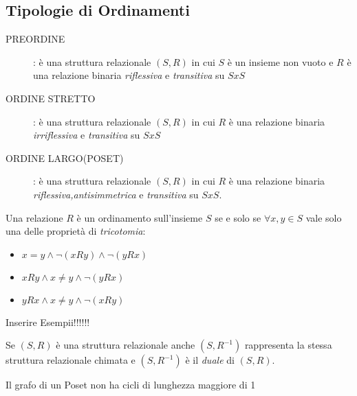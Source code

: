 \subsection{Tipologie di Ordinamenti}
\begin{description}
    \item[PREORDINE]: è una struttura relazionale $(S,R)$ in cui $S$ è un insieme non vuoto
          e $R$ è una relazione binaria \emph{riflessiva} e \emph{transitiva} su $S x S$
    \item[ORDINE STRETTO]: è una struttura relazionale $(S,R)$ in cui $R$ è una
          relazione binaria \emph{irriflessiva} e \emph{transitiva} su $S x S$
    \item[ORDINE LARGO(POSET)]: è una struttura relazionale $(S,R)$ in cui $R$ è una
          relazione binaria \emph{riflessiva,antisimmetrica} e \emph{transitiva} su $S x S$.
\end{description}

Una relazione $R$ è un ordinamento sull'insieme $S$ se e solo se $\forall x,y \in S$
vale solo una delle proprietà di \emph{tricotomia}:
\begin{itemize}
    \item $x = y \land \neg(xRy) \land \neg(yRx)$
    \item $xRy \land x \neq y \land \neg(yRx)$
    \item $yRx \land x \neq y \land \neg(xRy)$
\end{itemize}

Inserire Esempii!!!!!!

\begin{prop}
Se $(S,R)$ è una struttura relazionale anche $(S,R^{-1})$ rappresenta la stessa
struttura relazionale chimata e $(S,R^{-1})$ è il \emph{duale} di $(S,R)$.
\end{prop}


\begin{prop}
Il grafo di un Poset non ha cicli di lunghezza maggiore di 1
\end{prop}

